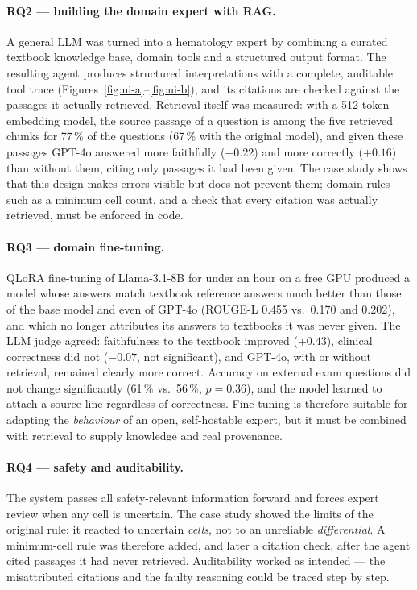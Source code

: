 \paragraph{RQ2 --- building the domain expert with RAG.} A general LLM was turned into a hematology expert by combining a curated textbook knowledge base, domain tools and a structured output format. The resulting agent produces structured interpretations with a complete, auditable tool trace (Figures~\ref{fig:ui-a}--\ref{fig:ui-b}), and its citations are checked against the passages it actually retrieved. Retrieval itself was measured: with a 512-token embedding model, the source passage of a question is among the five retrieved chunks for 77\,\% of the questions (67\,\% with the original model), and given these passages GPT-4o answered more faithfully ($+0.22$) and more correctly ($+0.16$) than without them, citing only passages it had been given. The case study shows that this design makes errors visible but does not prevent them; domain rules such as a minimum cell count, and a check that every citation was actually retrieved, must be enforced in code.

\paragraph{RQ3 --- domain fine-tuning.} QLoRA fine-tuning of Llama-3.1-8B for under an hour on a free GPU produced a model whose answers match textbook reference answers much better than those of the base model and even of GPT-4o (ROUGE-L 0.455 vs.\ 0.170 and 0.202), and which no longer attributes its answers to textbooks it was never given. The LLM judge agreed: faithfulness to the textbook improved ($+0.43$), clinical correctness did not ($-0.07$, not significant), and GPT-4o, with or without retrieval, remained clearly more correct. Accuracy on external exam questions did not change significantly (61\,\% vs.\ 56\,\%, $p = 0.36$), and the model learned to attach a source line regardless of correctness. Fine-tuning is therefore suitable for adapting the \emph{behaviour} of an open, self-hostable expert, but it must be combined with retrieval to supply knowledge and real provenance.

\paragraph{RQ4 --- safety and auditability.} The system passes all safety-relevant information forward and forces expert review when any cell is uncertain. The case study showed the limits of the original rule: it reacted to uncertain \emph{cells}, not to an unreliable \emph{differential}. A minimum-cell rule was therefore added, and later a citation check, after the agent cited passages it had never retrieved. Auditability worked as intended --- the misattributed citations and the faulty reasoning could be traced step by step.

